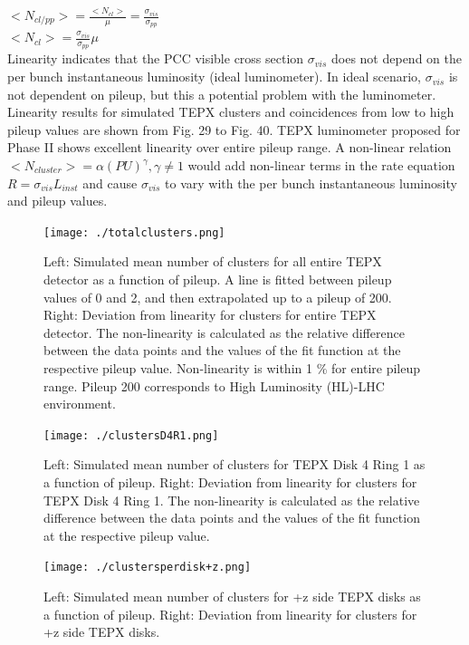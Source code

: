 $<N_{cl/pp}> = \frac{<N_{cl}>}{\mu} = \frac{\sigma_{vis}}{\sigma_{pp}}$ \\

$<N_{cl}> =  \frac{\sigma_{vis}}{\sigma_{pp}} \mu $ \\

Linearity indicates that the PCC visible cross section $\sigma_{vis}$ does not depend on the per bunch instantaneous luminosity (ideal luminometer). In ideal scenario, $\sigma_{vis}$ is not dependent on pileup, but this a potential problem with the luminometer. Linearity results for simulated TEPX clusters and coincidences from low to high pileup values are shown from Fig. 29 to Fig. 40. TEPX luminometer proposed for Phase II shows excellent linearity over entire pileup range. A non-linear relation $<N_{cluster}> = \alpha (PU)^{\gamma}, \gamma \neq 1$ would add non-linear terms in the rate equation $R = \sigma_{vis} L_{inst}$  and cause $\sigma_{vis}$ to vary with the per bunch instantaneous luminosity and pileup values.


\begin{figure}[H]
  \centering
  \texttt{[image: ./totalclusters.png]}
  \caption{\onehalfspacing Left: Simulated mean number of clusters for all entire TEPX detector as a function of pileup. A line is fitted between pileup values of 0 and 2, and then extrapolated up to a pileup of 200. Right: Deviation from linearity for clusters for entire TEPX detector. The non-linearity is calculated as the relative difference between the data points and the values of the fit function at the respective pileup value. Non-linearity is within 1 \% for entire pileup range. Pileup 200 corresponds to High Luminosity (HL)-LHC environment.}
  \label{fig:CMS}
\end{figure}



\begin{figure}[H]
  \centering
  \texttt{[image: ./clustersD4R1.png]}
  \caption{\onehalfspacing Left: Simulated mean number of clusters for TEPX Disk 4 Ring 1 as a function of pileup. Right: Deviation from linearity for clusters for TEPX Disk 4 Ring 1. The non-linearity is calculated as the relative difference between the data points and the values of the fit function at the respective pileup value.}
  \label{fig:CMS}
\end{figure}



\begin{figure}[H]
  \centering
  \texttt{[image: ./clustersperdisk+z.png]}
  \caption{Left: Simulated mean number of clusters for +z side TEPX disks as a function of pileup. Right: Deviation from linearity for clusters for +z side TEPX disks.}
  \label{fig:CMS}
\end{figure}




